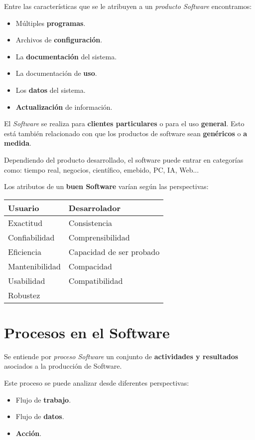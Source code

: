 Entre las características que se le atribuyen a un \emph{producto
  Software} encontramos:
\begin{itemize}[noitemsep]
\item Múltiples \textbf{programas}.
\item Archivos de \textbf{configuración}.
\item La \textbf{documentación} del sistema.
\item La documentación de \textbf{uso}.
\item Los \textbf{datos} del sistema.
\item \textbf{Actualización} de información.
\end{itemize}

El \textit{Software} se realiza para \textbf{clientes particulares} o
para el uso \textbf{general}. Esto está también relacionado con que
los productos de software sean \textbf{genéricos} o \textbf{a medida}.

Dependiendo del producto desarrollado, el software puede entrar en
categorías como: tiempo real, negocios, científico, emebido, PC, IA,
Web...

Los atributos de un \textbf{buen Software} varían según las perspectivas:
\begin{center}
\begin{tabular}[h]{p{5cm} | p{5cm}}
  \textbf{Usuario} & \textbf{Desarrolador} \\ \hline
  Exactitud & Consistencia \\
  Confiabilidad & Comprensibilidad \\
  Eficiencia & Capacidad de ser probado \\
  Mantenibilidad & Compacidad \\
  Usabilidad & Compatibilidad \\
  Robustez & 
\end{tabular}  
\end{center}

\section{Procesos en el Software}
\label{sec:procesos}

Se entiende por \emph{proceso Software} un conjunto de \textbf{actividades y
  resultados} asociados a la producción de Software.

Este proceso se puede analizar desde diferentes perspectivas:
\begin{itemize}[noitemsep]
\item Flujo de \textbf{trabajo}.
\item Flujo de \textbf{datos}.
\item \textbf{Acción}.
\end{itemize}

